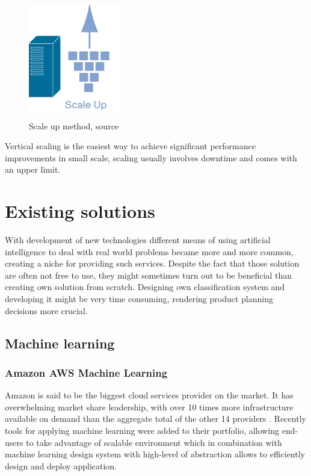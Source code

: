 \begin{enumerate}
		\begin{figure}[H]
			\begin{center}
				\includegraphics[width=0.2\linewidth]{images/scaleup.png}
				\caption{Scale up method, source \cite{scale_out_up} }
				\label{svm-plot2}
			\end{center}
		\end{figure}
		
		Vertical scaling is the easiest way to achieve significant performance improvements in small scale, scaling usually involves downtime and comes with an upper limit.
	\end{enumerate}

\section{Existing solutions}
	With development of new technologies different means of using artificial intelligence to deal with real world problems became more and more common, creating a niche for providing such services. Despite the fact that those solution are often not free to use, they might sometimes turn out to be beneficial than creating own solution from scratch. Designing own classification system and developing it might be very time consuming, rendering product planning decisions more crucial.
	\subsection{Machine learning}
		
		\subsubsection{Amazon AWS Machine Learning}
		Amazon is said to be the biggest cloud services provider on the market. It has overwhelming market share leadership, with over 10 times more infrastructure available on demand than the aggregate total of the other 14 providers \cite{amazon_leader}. Recently tools for applying machine learning were added to their portfolio, allowing end-users to take advantage of scalable environment which in combination with machine learning design system with high-level of abstraction allows to efficiently design and deploy application. 
		
